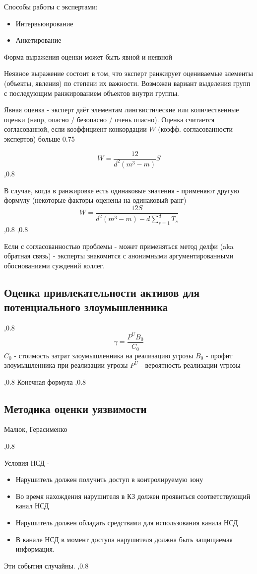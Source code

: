 \documentclass[a4paper,12pt]{report}
\begin{document}
			Способы работы с экспертами:
			\begin{itemize}
				\item Интервьюирование
				\item Анкетирование
			\end{itemize}

			Форма выражения оценки может быть явной  и неявной

			Неявное выражение состоит в том, что эксперт ранжирует оцениваемые элементы (объекты, явления) по степени их важности. Возможен вариант выделения групп с последующим ранжированием объектов внутри группы.

			Явная оценка - эксперт даёт элементам лингвистические или количественные оценки (напр, опасно / безопасно / очень опасно).
			Оценка считается согласованной, если коэффициент конкордации $W$ (коэфф.  согласованности экспертов) больше 0.75

			$$
			W = \frac{12}{d^2(m^3 - m)}S
			$$
			,0.8

			В случае, когда в ранжировке есть одинаковые значения - применяют другую формулу (некоторые факторы оценены на одинаковый ранг)
			$$
			W = \frac{12 S}{d^2(m^3 - m) - d \sum\limits^d_{s=1}T_s}
			$$
			,0.8
			,0.8

			Если с согласованностью проблемы - может применяться метод делфи (aka обратная связь) - эксперты знакомится с анонимными аргументированными обоснованиями суждений коллег.

	\subsection{Оценка привлекательности активов для потенциального злоумышленника}
		,0.8
		$$
		\gamma = \frac{P^U B_0}{C_0}
		$$
		$C_0$ - стоимость затрат злоумышленника на реализацию угрозы
		$B_0$ - профит злоумышленника при реализации угрозы
		$P^U$ - вероятность реализации угрозы

		,0.8
		Конечная формула
		,0.8

	\subsection{Методика оценки уязвимости}
		Малюк, Герасименко

		,0.8

		Условия НСД -
		\begin{itemize}
			\item Нарушитель должен получить доступ в контролируемую зону
			\item Во время нахождения нарушителя в КЗ должен проявиться соответствующий канал НСД
			\item Нарушитель должен обладать средствами для использования канала НСД
			\item В канале НСД в момент  доступа нарушителя должна быть защищаемая информация.
		\end{itemize}
		Эти события случайны.
		,0.8
\end{document}
